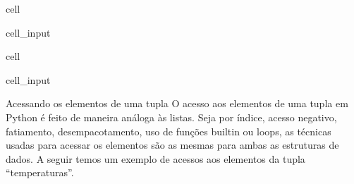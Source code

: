 \documentclass[letterpaper,10pt,english]{jupyterBook}
\begin{document}
\begin{sphinxuseclass}{cell}\begin{sphinxVerbatimInput}

\begin{sphinxuseclass}{cell_input}
\begin{sphinxVerbatim}[commandchars=\\\{\}]
      
\end{sphinxVerbatim}

\end{sphinxuseclass}\end{sphinxVerbatimInput}

\end{sphinxuseclass}
\begin{sphinxuseclass}{cell}\begin{sphinxVerbatimInput}

\begin{sphinxuseclass}{cell_input}
\begin{sphinxVerbatim}[commandchars=\\\{\}]
     \PYG{p}{[}  \PYG{p}{]}   \PYG{p}{[}  \PYG{p}{]}
\end{sphinxVerbatim}

\end{sphinxuseclass}\end{sphinxVerbatimInput}

\end{sphinxuseclass}
\sphinxAtStartPar
Acessando os elementos de uma tupla
O acesso aos elementos de uma tupla em Python é feito de maneira análoga às listas. Seja por índice, acesso negativo, fatiamento, desempacotamento, uso de funções built\sphinxhyphen{}in ou loops, as técnicas usadas para acessar os elementos são as mesmas para ambas as estruturas de dados. A seguir temos um exemplo de acessos aos elementos da tupla “temperaturas”.
\end{document}
